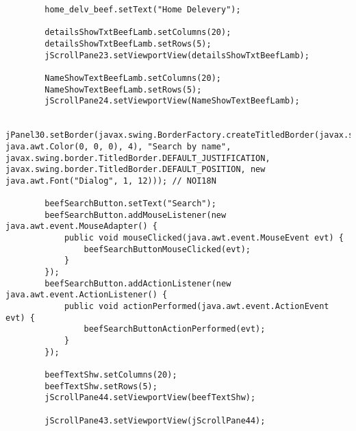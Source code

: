 \documentclass[12pt,a4paper]{article}
\begin{document}
\begin{lstlisting}
        home_delv_beef.setText("Home Delevery");

        detailsShowTxtBeefLamb.setColumns(20);
        detailsShowTxtBeefLamb.setRows(5);
        jScrollPane23.setViewportView(detailsShowTxtBeefLamb);

        NameShowTextBeefLamb.setColumns(20);
        NameShowTextBeefLamb.setRows(5);
        jScrollPane24.setViewportView(NameShowTextBeefLamb);

        jPanel30.setBorder(javax.swing.BorderFactory.createTitledBorder(javax.swing.BorderFactory.createLineBorder(new java.awt.Color(0, 0, 0), 4), "Search by name", javax.swing.border.TitledBorder.DEFAULT_JUSTIFICATION, javax.swing.border.TitledBorder.DEFAULT_POSITION, new java.awt.Font("Dialog", 1, 12))); // NOI18N

        beefSearchButton.setText("Search");
        beefSearchButton.addMouseListener(new java.awt.event.MouseAdapter() {
            public void mouseClicked(java.awt.event.MouseEvent evt) {
                beefSearchButtonMouseClicked(evt);
            }
        });
        beefSearchButton.addActionListener(new java.awt.event.ActionListener() {
            public void actionPerformed(java.awt.event.ActionEvent evt) {
                beefSearchButtonActionPerformed(evt);
            }
        });

        beefTextShw.setColumns(20);
        beefTextShw.setRows(5);
        jScrollPane44.setViewportView(beefTextShw);

        jScrollPane43.setViewportView(jScrollPane44);


\end{lstlisting}
\end{document}
